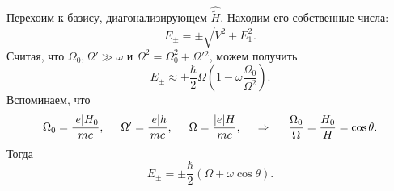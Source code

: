 Перехоим к базису, диагонализирующем $\hat{\tilde{H}}$. Находим его собственные числа:
\begin{equation*}
    E_\pm = \pm \sqrt{V^2 + E_1^2}.
\end{equation*}
Считая, что $\Omega_0, \Omega' \gg \omega$ и $\Omega^2 = \Omega_0^2 + \Omega'{}^2$, можем получить
\begin{equation*}
    E_\pm \approx  \pm \frac{\hbar}{2} \Omega \left(1 - \omega \frac{\Omega_0}{\Omega^2}\right).
\end{equation*}
Вспоминаем, что
\begin{equation*}
    \Omega_0 = \frac{|e| H_0}{mc},
    \hspace{5 mm} 
    \Omega' = \frac{|e| h}{mc},
    \hspace{5 mm} 
    \Omega = \frac{|e| H}{mc},
    \hspace{0.5cm} \Rightarrow \hspace{0.5cm}
    \frac{\Omega_0}{\Omega} = \frac{H_0}{H} = \cos \theta.
\end{equation*}
Тогда
\begin{equation*}
    E_\pm = \pm \frac{\hbar}{2} \left(\Omega + \omega \cos \theta\right).
\end{equation*}


